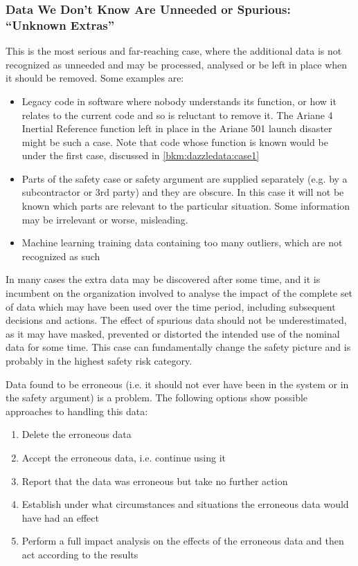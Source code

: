 \subsubsection{Data We Don’t Know Are Unneeded or Spurious: ``Unknown Extras''}
This is the most serious and far-reaching case, where the additional data is not recognized as unneeded and may be processed, analysed or be left in place when it should be removed. Some examples are:
\begin{itemize}
\item Legacy code in software where nobody understands its function, or how it relates to the current code and so is reluctant to remove it. The Ariane 4 Inertial Reference function left in place in the Ariane 501 launch disaster might be such a case. Note that code whose function is known would be under the first case, discussed in \ref{bkm:dazzledata:case1}
    \item Parts of the safety case or safety argument are supplied separately (e.g. by a subcontractor or 3rd party) and they are obscure. In this case it will not be known which parts are relevant to the particular situation. Some information may be irrelevant or worse, misleading.
    \item Machine learning training data containing too many outliers, which are not recognized as such
\end{itemize}

In many cases the extra data may be discovered after some time, and it is incumbent on the organization involved to analyse the impact of the complete set of data which may have been used over the time period, including subsequent decisions and actions. The effect of spurious data should not be underestimated, as it may have masked, prevented or distorted the intended use of the nominal data for some time. This case can fundamentally change the safety picture and is probably in the highest safety risk category.

Data found to be erroneous (i.e. it should not ever have been in the system or in the safety argument) is a problem. The following options show possible approaches to handling this data:
\begin{enumerate}[label=\color{dsiwgAccentColour}\roman*)]
    \item Delete the erroneous data
    \item Accept the erroneous data, i.e. continue using it
    \item Report that the data was erroneous but take no further action 
    \item Establish under what circumstances and situations the erroneous data would have had an effect
    \item Perform a full impact analysis on the effects of the erroneous data and then act according to the results
\end{enumerate}

